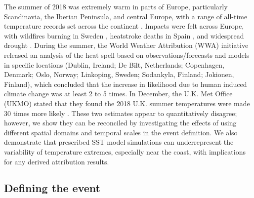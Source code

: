   The summer of 2018 was extremely warm in parts of Europe, particularly Scandinavia, the Iberian Peninsula, and central Europe, with a range of all-time temperature records set across the continent \citep{johnston_heatwave_2018,nesdis_record_2018}. Impacts were felt across Europe, with wildfires burning in Sweden \citep{krikken_attribution_2021,watts_wildfires_2018}, heatstroke deaths in Spain \citep{publico_nueve_2018}, and widespread drought \citep{harris_heat_2018}. During the summer, the World Weather Attribution (WWA) initiative released an analysis of the heat spell \citep{world_weather_attribution_heatwave_2018} based on observations/forecasts and models in specific locations (Dublin, Ireland; De Bilt, Netherlands; Copenhagen, Denmark; Oslo, Norway; Linkoping, Sweden; Sodankyla, Finland; Jokionen, Finland), which concluded that the increase in likelihood due to human induced climate change was at least 2 to 5 times. In December, the U.K. Met Office (UKMO) stated that they found the 2018 U.K. summer temperatures were made 30 times more likely \citep{press_office_chance_2018,mccarthy_drivers_2019}. These two estimates appear to quantitatively disagree; however, we show they can be reconciled by investigating the effects of using different spatial domains and temporal scales in the event definition. We also demonstrate that prescribed SST model simulations can underrepresent the variability of temperature extremes, especially near the coast, with implications for any derived attribution results.

\subsection{Defining the event}

